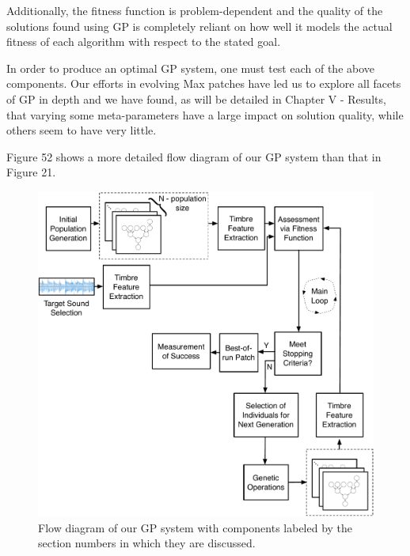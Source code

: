 \documentclass[12pt]{report} 	%
\numberwithin{figure}{chapter}
\numberwithin{table}{chapter}
\numberwithin{equation}{chapter}
\begin{document}
\begin{flushleft}
Additionally, the fitness function is problem-dependent and the quality of the solutions found using GP is completely reliant on how well it models the actual fitness of each algorithm with respect to the stated goal.

In order to produce an optimal GP system, one must test each of the above components. Our efforts in evolving Max patches have led us to explore all facets of GP in depth and we have found, as will be detailed in Chapter V - Results, that varying some meta-parameters have a large impact on solution quality, while others seem to have very little. 

Figure 52 shows a more detailed flow diagram of our GP system than that in Figure 21.
\begin{figure}[h!]
\begin{center}
\includegraphics[scale=0.5]{OverallGPSystem}
\caption[Flow diagram of overall GP system]{Flow diagram of our GP system with components labeled by the section numbers in which they are discussed.}
\end{center}
\end{figure}

\end{flushleft}
\end{document}
